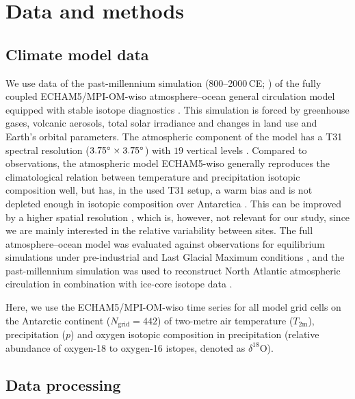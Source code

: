 \documentclass[cp, manuscript]{copernicus}
\begin{document}
\section{Data and methods}\label{methods}

\subsection{Climate model data}\label{methods:data}

We use data of the past-millennium simulation (800--2000\,CE;
\citealp{Sjolte2018}) of the fully coupled ECHAM5/MPI-OM-wiso atmosphere--ocean
general circulation model equipped with stable isotope diagnostics
\citep{Werner2016}. This simulation is forced by greenhouse gases, volcanic
aerosols, total solar irradiance and changes in land use and Earth's orbital
parameters. The atmospheric component of the model has a T31 spectral resolution
($3.75^{\circ}\times3.75^{\circ}$) with $19$ vertical levels
\citep{Sjolte2018}. Compared to observations, the atmospheric model ECHAM5-wiso
generally reproduces the climatological relation between temperature and
precipitation isotopic composition well, but has, in the used T31 setup, a warm
bias and is not depleted enough in isotopic composition over Antarctica
\citep{Werner2011}. This can be improved by a higher spatial resolution
\citep{Werner2011}, which is, however, not relevant for our study, since we are
mainly interested in the relative variability between sites. The full
atmosphere--ocean model was evaluated against observations for equilibrium
simulations under pre-industrial and Last Glacial Maximum conditions
\citep{Werner2016}, and the past-millennium simulation was used to reconstruct
North Atlantic atmospheric circulation in combination with ice-core isotope data
\citep{Sjolte2018}.

Here, we use the ECHAM5/MPI-OM-wiso time series for all model grid cells
on the Antarctic continent ($N_{\mathrm{grid}}=442$) of two-metre air
temperature ($T_{2\mathrm{m}}$), precipitation ($p$) and oxygen isotopic
composition in precipitation (relative abundance of oxygen-18 to oxygen-16
istopes, denoted as $\delta^{18}\mathrm{O}$).

\subsection{Data processing}\label{methods:prc}
\end{document}
